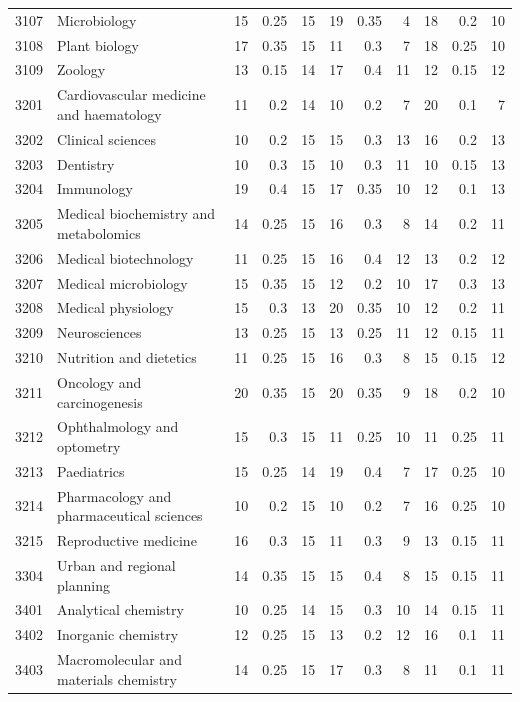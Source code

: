 \begin{longtable}{r p{2.15cm} rrr rrr rrr}
3107 & Microbiology & 15 & 0.25 & 15 & 19 & 0.35 & 4 & 18 & 0.2 & 10 \\
3108 & Plant biology & 17 & 0.35 & 15 & 11 & 0.3 & 7 & 18 & 0.25 & 10 \\
3109 & Zoology & 13 & 0.15 & 14 & 17 & 0.4 & 11 & 12 & 0.15 & 12 \\
3201 & Cardiovascular medicine and haematology & 11 & 0.2 & 14 & 10 & 0.2 & 7 & 20 & 0.1 & 7 \\
3202 & Clinical sciences & 10 & 0.2 & 15 & 15 & 0.3 & 13 & 16 & 0.2 & 13 \\
3203 & Dentistry & 10 & 0.3 & 15 & 10 & 0.3 & 11 & 10 & 0.15 & 13 \\
3204 & Immunology & 19 & 0.4 & 15 & 17 & 0.35 & 10 & 12 & 0.1 & 13 \\
3205 & Medical biochemistry and metabolomics & 14 & 0.25 & 15 & 16 & 0.3 & 8 & 14 & 0.2 & 11 \\
3206 & Medical biotechnology & 11 & 0.25 & 15 & 16 & 0.4 & 12 & 13 & 0.2 & 12 \\
3207 & Medical microbiology & 15 & 0.35 & 15 & 12 & 0.2 & 10 & 17 & 0.3 & 13 \\
3208 & Medical physiology & 15 & 0.3 & 13 & 20 & 0.35 & 10 & 12 & 0.2 & 11 \\
3209 & Neurosciences & 13 & 0.25 & 15 & 13 & 0.25 & 11 & 12 & 0.15 & 11 \\
3210 & Nutrition and dietetics & 11 & 0.25 & 15 & 16 & 0.3 & 8 & 15 & 0.15 & 12 \\
3211 & Oncology and carcinogenesis & 20 & 0.35 & 15 & 20 & 0.35 & 9 & 18 & 0.2 & 10 \\
3212 & Ophthalmology and optometry & 15 & 0.3 & 15 & 11 & 0.25 & 10 & 11 & 0.25 & 11 \\
3213 & Paediatrics & 15 & 0.25 & 14 & 19 & 0.4 & 7 & 17 & 0.25 & 10 \\
3214 & Pharmacology and pharmaceutical sciences & 10 & 0.2 & 15 & 10 & 0.2 & 7 & 16 & 0.25 & 10 \\
3215 & Reproductive medicine & 16 & 0.3 & 15 & 11 & 0.3 & 9 & 13 & 0.15 & 11 \\
3304 & Urban and regional planning & 14 & 0.35 & 15 & 15 & 0.4 & 8 & 15 & 0.15 & 11 \\
3401 & Analytical chemistry & 10 & 0.25 & 14 & 15 & 0.3 & 10 & 14 & 0.15 & 11 \\
3402 & Inorganic chemistry & 12 & 0.25 & 15 & 13 & 0.2 & 12 & 16 & 0.1 & 11 \\
3403 & Macromolecular and materials chemistry & 14 & 0.25 & 15 & 17 & 0.3 & 8 & 11 & 0.1 & 11 \\

\end{longtable}
